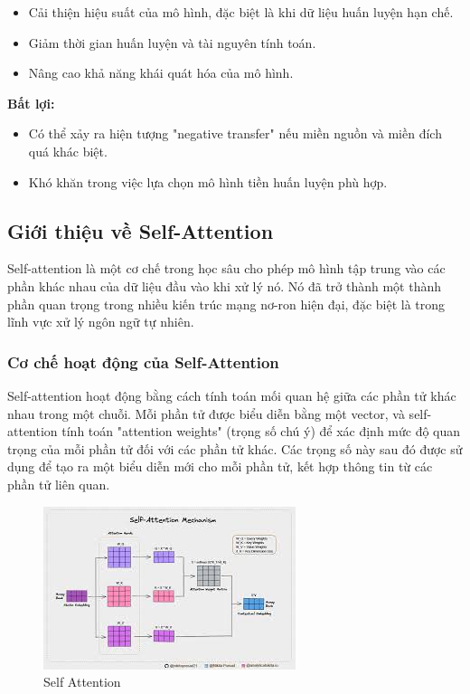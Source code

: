 \begin{itemize}
    \item Cải thiện hiệu suất của mô hình, đặc biệt là khi dữ liệu huấn luyện hạn chế.
    \item Giảm thời gian huấn luyện và tài nguyên tính toán.
    \item Nâng cao khả năng khái quát hóa của mô hình.
\end{itemize}

\textbf{Bất lợi:}

\begin{itemize}
    \item Có thể xảy ra hiện tượng "negative transfer" nếu miền nguồn và miền đích quá khác biệt.
    \item Khó khăn trong việc lựa chọn mô hình tiền huấn luyện phù hợp.
\end{itemize}
\subsection{Giới thiệu về Self-Attention}

Self-attention là một cơ chế trong học sâu cho phép mô hình tập trung vào các phần khác nhau của dữ liệu đầu vào khi xử lý nó. Nó đã trở thành một thành phần quan trọng trong nhiều kiến trúc mạng nơ-ron hiện đại, đặc biệt là trong lĩnh vực xử lý ngôn ngữ tự nhiên.

\subsubsection{Cơ chế hoạt động của Self-Attention}

Self-attention hoạt động bằng cách tính toán mối quan hệ giữa các phần tử khác nhau trong một chuỗi. Mỗi phần tử được biểu diễn bằng một vector, và self-attention tính toán "attention weights" (trọng số chú ý) để xác định mức độ quan trọng của mỗi phần tử đối với các phần tử khác. Các trọng số này sau đó được sử dụng để tạo ra một biểu diễn mới cho mỗi phần tử, kết hợp thông tin từ các phần tử liên quan.


 \begin{figure}[H]
    \centering
    \includegraphics[scale = 1]{Images/Theoretical basis/self-attention.jpg}
\caption{Self Attention}
\end{figure}

